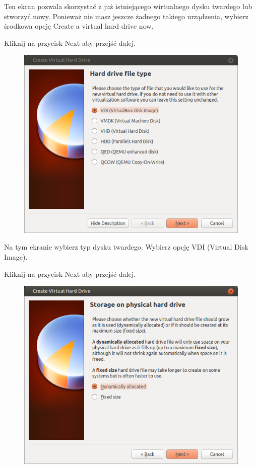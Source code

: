 Ten ekran pozwala skorzystać z już istniejącego wirtualnego dysku twardego lub stworzyć nowy. Ponieważ nie masz jeszcze żadnego takiego urządzenia, wybierz środkowa opcję \textcolor{ubuntu_orange}{Create a virtual hard drive now}.
\begin{flushright}
Kliknij na przycisk \textcolor{ubuntu_orange}{Next} aby przejść dalej.
\end{flushright}
\clearpage
\begin{figure}
                \includegraphics[width=\linewidth]{images/virtualbox_wizard4.png}
\end{figure}

Na tym ekranie wybierz typ dysku twardego. Wybierz opcję \textcolor{ubuntu_orange}{VDI (Virtual Disk Image)}.
\begin{flushright}
Kliknij na przycisk \textcolor{ubuntu_orange}{Next} aby przejść dalej.
\end{flushright}
\clearpage
\begin{figure}
	\includegraphics[width=\linewidth]{images/virtualbox_wizard5.png}
\end{figure}

